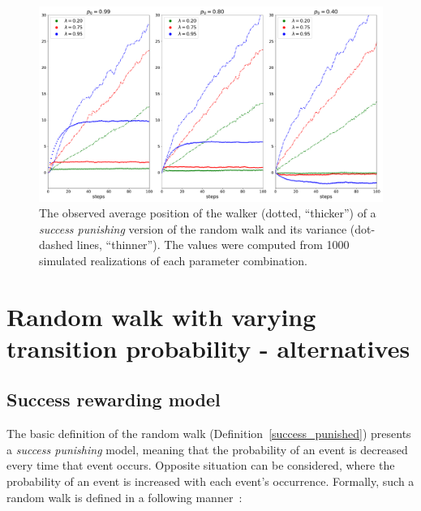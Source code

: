 \documentclass{amsart}
\theoremstyle{definition}
\theoremstyle{plain}
\theoremstyle{plain}
\theoremstyle{plain}
\numberwithin{equation}{section}
\begin{document}
    \begin{figure}
        \begin{center}
            \includegraphics[width=1\textwidth]{../simulations/e_position_1000_walks_100_steps_type_success_punished}
            \caption{\label{fig:position-punished}The observed
            average position of the walker (dotted, ``thicker'')
                of a \emph{success punishing} version of the random walk and its variance (dot-dashed lines, ``thinner'').
                The values were
                computed from 1000 simulated realizations of each parameter combination.}
        \end{center}
    \end{figure}


    \section{Random walk with varying transition probability - alternatives}\label{sec:Random-walk-aternatives}

    \subsection{Success rewarding model}\label{subsec:success-rewarding-model}

    The basic definition of the random walk (Definition~\ref{success_punished})
    presents a \emph{success punishing} model, meaning that the probability
    of an event is decreased every time that event occurs.
    Opposite situation
    can be considered, where the probability of an event is increased
    with each event's occurrence.
    Formally, such a random walk is defined
    in a following manner~\cite{ja2019teze}:
\end{document}
